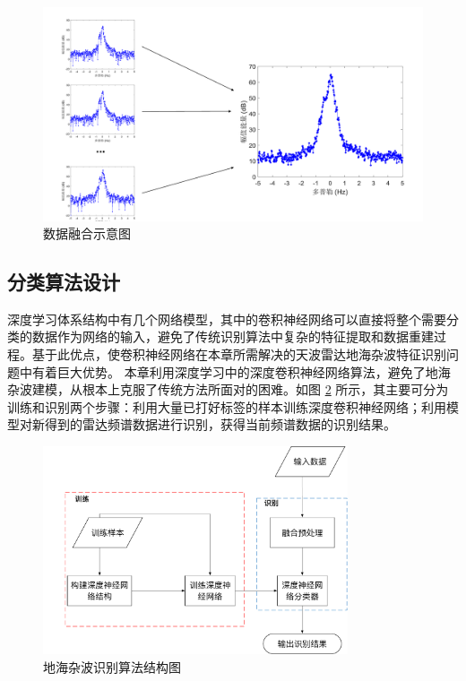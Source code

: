 \begin{figure}[hbt]
	\centering
	\includegraphics[width=13.5cm]{figures/othr/spectrum_fusion}
	\caption{数据融合示意图}
	\label{fig:spectrum_fusion}
\end{figure}

\subsection{分类算法设计}
深度学习体系结构中有几个网络模型，其中的卷积神经网络可以直接将整个需要分类的数据作为网络的输入，避免了传统识别算法中复杂的特征提取和数据重建过程。基于此优点，使卷积神经网络在本章所需解决的天波雷达地海杂波特征识别问题中有着巨大优势。
本章利用深度学习中的深度卷积神经网络算法，避免了地海杂波建模，从根本上克服了传统方法所面对的困难。如图 \ref{fig:othr_tech} 所示，其主要可分为训练和识别两个步骤：利用大量已打好标签的样本训练深度卷积神经网络；利用模型对新得到的雷达频谱数据进行识别，获得当前频谱数据的识别结果。

\begin{figure}[hbt]
	\centering
	\includegraphics[width=9cm]{figures/othr/othr_tech}
	\caption{地海杂波识别算法结构图}
	\label{fig:othr_tech}
\end{figure}

